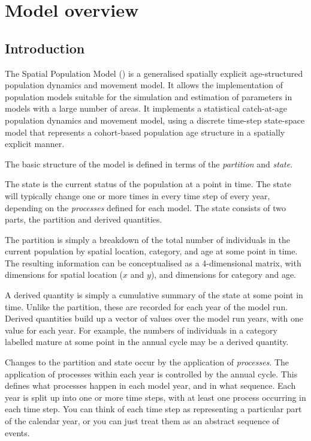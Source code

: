 \section{Model overview\label{sec:overview}}

\subsection{Introduction}

The Spatial Population Model (\SPM) is a generalised spatially explicit age-structured population dynamics and movement model. It allows the implementation of population models suitable for the simulation and estimation of parameters in models with a large number of areas. It implements a statistical catch-at-age population dynamics and movement model, using a discrete time-step state-space model that represents a cohort-based population age structure in a spatially explicit manner. 

The basic structure of the model is defined in terms of the \emph{partition} and \emph{state}. 

The state is the current status of the population at a point in time. The state will typically change one or more times in every time step of every year, depending on the \emph{processes} defined for each model. The state consists of two parts, the partition and derived quantities. 

The partition is simply a breakdown of the total number of individuals in the current population by spatial location, category, and age at some point in time. The resulting information can be conceptualised as a 4-dimensional matrix, with dimensions for spatial location ($x$ and $y$), and dimensions for category and age. 

A derived quantity is simply a cumulative summary of the state at some point in time. Unlike the partition, these are recorded for each year of the model run. Derived quantities build up a vector of values over the model run years, with one value for each year. For example, the numbers of individuals in a category labelled mature at some point in the annual cycle may be a derived quantity. 

Changes to the partition and state occur by the application of \emph{processes}. The application of processes within each year is controlled by the annual cycle. This defines what processes happen in each model year, and in what sequence. Each year is split up into one or more time steps, with at least one process occurring in each time step. You can think of each time step as representing a particular part of the calendar year, or you can just treat them as an abstract sequence of events.

